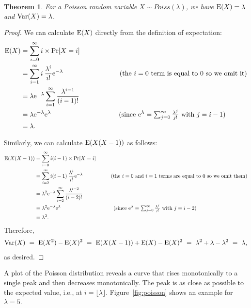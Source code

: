 \documentclass[11pt]{article}
\def\Ex#1{{\rm E}(#1)}
\def\Var#1{{\rm Var}(#1)}
\newcounter{thm}
\newtheorem{theorem}{Theorem}[thm]
\begin{document}
\begin{theorem}
For a Poisson random variable $X \sim Poiss(\lambda)$, we have $\Ex{X} = \lambda$ and $\Var{X} = \lambda$.
\end{theorem}
\begin{proof}
We can calculate $\Ex{X}$ directly from the definition of expectation:
\begin{align*}
\Ex{X}&=\sum_{i=0}^\infty i\times\Pr[X=i]\\
               &=\sum_{i=1}^\infty i \: {{\lambda^i}\over{i!}}{\rm e}^{-\lambda}  ~~~~~~~~~~~~~~~~~~~~~~~~~ \text{(the $i=0$ term is equal to $0$ so we omit it)}\\
               &=\lambda{\rm e}^{-\lambda}\sum_{i=1}^\infty{{\lambda^{i-1}}\over{(i-1)!}}\\
               &=\lambda{\rm e}^{-\lambda}{\rm e}^{\lambda} ~~~~~~~~~~~~~~~~~~~~~~~~~~~~~~ \text{(since ${\rm e}^\lambda = \textstyle{\sum_{j=0}^\infty \frac{\lambda^j}{j!}}$ with $j = i-1$)}\\
               &=\lambda.
\end{align*}

Similarly, we can calculate $\Ex{X(X-1)}$ as follows:
\begin{align*}
\Ex{X(X-1)} &=\sum_{i=0}^\infty i(i-1) \times\Pr[X=i]\\
               &=\sum_{i=2}^\infty i(i-1) \: {{\lambda^i}\over{i!}}{\rm e}^{-\lambda}  ~~~~~~~~~~~~~~~~ \text{(the $i=0$ and $i=1$ terms are equal to $0$ so we omit them)}\\
               &=\lambda^2 {\rm e}^{-\lambda}\sum_{i=2}^\infty{{\lambda^{i-2}}\over{(i-2)!}}\\
               &=\lambda^2 {\rm e}^{-\lambda} {\rm e}^{\lambda} ~~~~~~~~~~~~~~~~~~~~~~~~~~~~~~ \text{(since ${\rm e}^\lambda = \textstyle{\sum_{j=0}^\infty \frac{\lambda^j}{j!}}$ with $j = i-2$)}\\
               &=\lambda^2.
\end{align*}
Therefore,
$$\Var{X} ~=~ \Ex{X^2} - \Ex{X}^2 ~=~ \Ex{X(X-1)} + \Ex{X} - \Ex{X}^2 ~=~ \lambda^2 + \lambda - \lambda^2 ~=~ \lambda,$$
as desired.
\end{proof}

A plot of the Poisson distribution reveals a curve that rises monotonically
to a single peak and then decreases monotonically.  The peak is
as close as possible to the expected value, i.e., at $i=\lfloor\lambda\rfloor$.
Figure~\ref{fig:poisson} shows an example for $\lambda = 5$.
\end{document}
